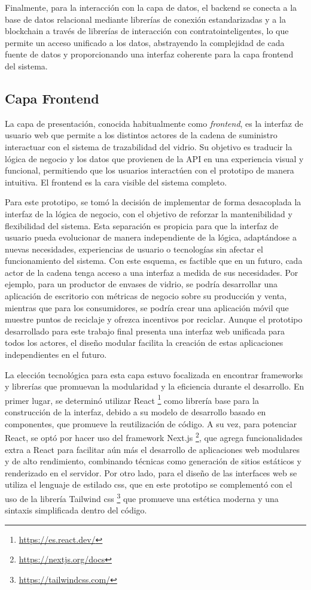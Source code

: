 Finalmente, para la interacción con la capa de datos, el backend se conecta a la base de datos relacional mediante librerías de conexión estandarizadas y a la blockchain a través de librerías de interacción con \glspl{contratointeligente}, lo que permite un acceso unificado a los datos, abstrayendo la complejidad de cada fuente de datos y proporcionando una interfaz coherente para la capa frontend del sistema.

\subsection{Capa Frontend}

La capa de presentación, conocida habitualmente como \textit{\gls{frontend}}, es la interfaz de usuario web que permite a los distintos actores de la cadena de suministro interactuar con el sistema de trazabilidad del vidrio. Su objetivo es traducir la lógica de negocio y los datos que provienen de la API en una experiencia visual y funcional, permitiendo que los usuarios interactúen con el prototipo de manera intuitiva. El frontend es la cara visible del sistema completo.

Para este prototipo, se tomó la decisión de implementar de forma desacoplada la interfaz de la lógica de negocio, con el objetivo de reforzar la mantenibilidad y flexibilidad del sistema. Esta separación es propicia para que la interfaz de usuario pueda evolucionar de manera independiente de la lógica, adaptándose a nuevas necesidades, experiencias de usuario o tecnologías sin afectar el funcionamiento del sistema. Con este esquema, es factible que en un futuro, cada actor de la cadena tenga acceso a una interfaz a medida de sus necesidades. Por ejemplo, para un productor de envases de vidrio, se podría desarrollar una aplicación de escritorio con métricas de negocio sobre su producción y venta, mientras que para los consumidores, se podría crear una aplicación móvil que muestre puntos de reciclaje y ofrezca incentivos por reciclar. Aunque el prototipo desarrollado para este trabajo final presenta una interfaz web unificada para todos los actores, el diseño modular facilita la creación de estas aplicaciones independientes en el futuro.

La elección tecnológica para esta capa estuvo focalizada en encontrar frameworks y librerías que promuevan la modularidad y la eficiencia durante el desarrollo. En primer lugar, se determinó utilizar React \footnote{\url{https://es.react.dev/}} como librería base para la construcción de la interfaz, debido a su modelo de desarrollo basado en componentes, que promueve la reutilización de código. A su vez, para potenciar React, se optó por hacer uso del framework Next.js \footnote{\url{https://nextjs.org/docs}}, que agrega funcionalidades extra a React para facilitar aún más el desarrollo de aplicaciones web modulares y de alto rendimiento, combinando técnicas como generación de sitios estáticos y renderizado en el servidor. Por otro lado, para el diseño de las interfaces web se utiliza el lenguaje de estilado \acrshort{css}, que en este prototipo se complementó con el uso de la librería Tailwind \acrshort{css} \footnote{\url{https://tailwindcss.com/}} que promueve una estética moderna y una sintaxis simplificada dentro del código.

